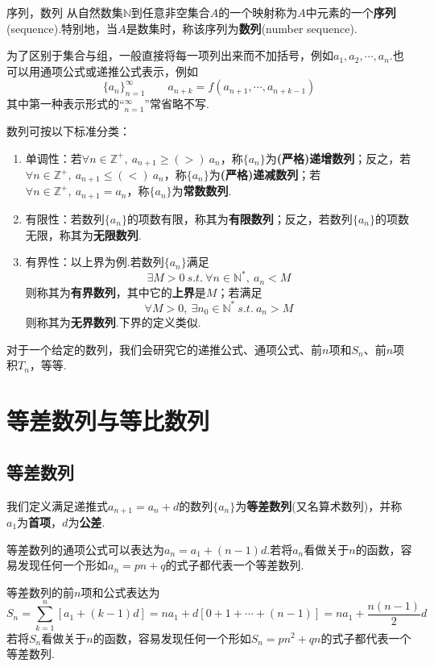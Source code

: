 \documentclass[lang=cn, zihao=5]{elegantbook}
\begin{document}
\begin{definition}{序列，数列}
	从自然数集$\mathbb{N}$到任意非空集合$A$的一个映射称为$A$中元素的一个\textbf{序列}(sequence).特别地，当$A$是数集时，称该序列为\textbf{数列}(number sequence).
\end{definition}

为了区别于集合与组，一般直接将每一项列出来而不加括号，例如$a_1,a_2, \cdots ,a_n$.也可以用通项公式或递推公式表示，例如
$$\{ a_n \}_{n=1}^{\infty} \qquad a_{n+k}=f(a_{n+1}, \cdots ,a_{n+k-1})$$
其中第一种表示形式的“$_{n=1}^{\infty}$”常省略不写.

数列可按以下标准分类：
\begin{enumerate}
	\item 单调性：若$\forall n \in \mathbb{Z}^+,~ a_{n+1} \geq (>)~ a_n$，称$\{ a_n \}$为\textbf{(严格)递增数列}；反之，若$\forall n \in \mathbb{Z}^+,~ a_{n+1} \leq (<)~ a_n$，称$\{ a_n \}$为\textbf{(严格)递减数列}；若$\forall n \in \mathbb{Z}^+,~ a_{n+1} = a_n$，称$\{ a_n \}$为\textbf{常数数列}.
	\item 有限性：若数列$\{ a_n \}$的项数有限，称其为\textbf{有限数列}；反之，若数列$\{ a_n \}$的项数无限，称其为\textbf{无限数列}.
	\item 有界性：以上界为例.若数列$\{ a_n \}$满足
	$$\exists M > 0 ~s.t.~ \forall n \in \mathbb{N}^{*},~ a_n<M$$
	则称其为\textbf{有界数列}，其中它的\textbf{上界}是$M$；若满足
	$$\forall M > 0 ,~ \exists n_0 \in \mathbb{N}^{*} ~s.t.~ a_n>M$$
	则称其为\textbf{无界数列}.下界的定义类似.
\end{enumerate}

对于一个给定的数列，我们会研究它的递推公式、通项公式、前$n$项和$S_n$、前$n$项积$T_n$，等等.

\section{等差数列与等比数列}

\subsection{等差数列}

我们定义满足递推式$a_{n+1}=a_n+d$的数列$\{ a_n \}$为\textbf{等差数列}(又名算术数列)，并称$a_1$为\textbf{首项}，$d$为\textbf{公差}.

等差数列的通项公式可以表达为$a_n=a_1+(n-1)d$.若将$a_n$看做关于$n$的函数，容易发现任何一个形如$a_n=pn+q$的式子都代表一个等差数列.

等差数列的前$n$项和公式表达为$$S_n = \sum _{k=1}^{n} [a_1+(k-1)d] = na_1 + d[0+ 1 + \cdots +(n-1)] = na_1 + \frac{n(n-1)}{2}d$$
若将$S_n$看做关于$n$的函数，容易发现任何一个形如$S_n=pn^2+qn$的式子都代表一个等差数列.
\end{document}
